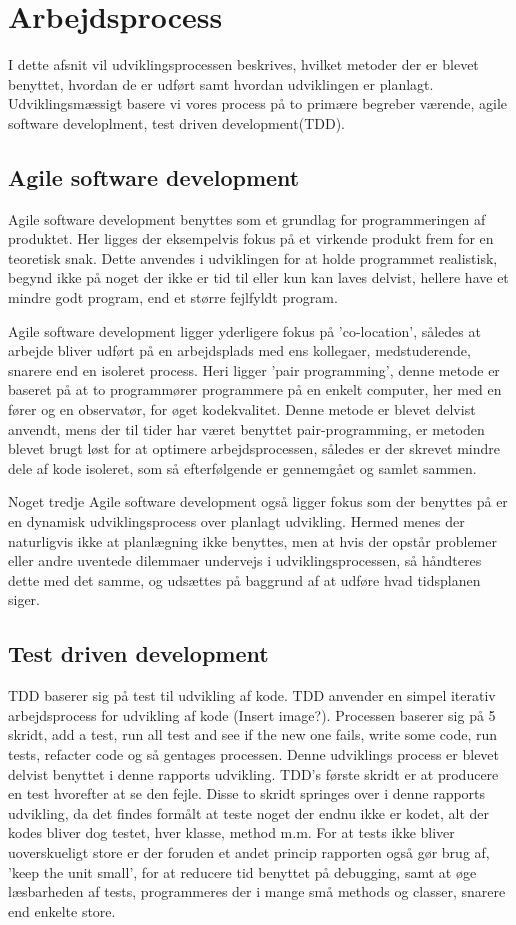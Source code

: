 \chapter{Arbejdsprocess}
I dette afsnit vil udviklingsprocessen beskrives, hvilket metoder der er blevet benyttet, hvordan de er udført samt hvordan udviklingen er planlagt. Udviklingsmæssigt basere vi vores process på to primære begreber værende, agile software developlment, test driven development(TDD).

\section{Agile software development}
Agile software development benyttes som et grundlag for programmeringen af produktet. Her ligges der eksempelvis fokus på et virkende produkt frem for en teoretisk snak. Dette anvendes i udviklingen for at holde programmet realistisk, begynd ikke på noget der ikke er tid til eller kun kan laves delvist, hellere have et mindre godt program, end et større fejlfyldt program.

Agile software development ligger yderligere fokus på 'co-location', således at arbejde bliver udført på en arbejdsplads med ens kollegaer, medstuderende, snarere end en isoleret process. Heri ligger 'pair programming', denne metode er baseret på at to programmører programmere på en enkelt computer, her med en fører og en observatør, for øget kodekvalitet. Denne metode er blevet delvist anvendt, mens der til tider har været benyttet pair-programming, er metoden blevet brugt løst for at optimere arbejdsprocessen, således er der skrevet mindre dele af kode isoleret, som så efterfølgende er gennemgået og samlet sammen.

Noget tredje Agile software development også ligger fokus som der benyttes på er en dynamisk udviklingsprocess over planlagt udvikling. Hermed menes der naturligvis ikke at planlægning ikke benyttes, men at hvis der opstår problemer eller andre uventede dilemmaer undervejs i udviklingsprocessen, så håndteres dette med det samme, og udsættes på baggrund af at udføre hvad tidsplanen siger. 

\section{Test driven development}
TDD baserer sig på test til udvikling af kode. TDD anvender en simpel iterativ arbejdsprocess for udvikling af kode (Insert image?). Processen baserer sig på 5 skridt, add a test, run all test and see if the new one fails, write some code, run tests, refacter code og så gentages processen. Denne udviklings process er blevet delvist benyttet i denne rapports udvikling. TDD's første skridt er at producere en test hvorefter at se den fejle. Disse to skridt springes over i denne rapports udvikling, da det findes formålt at teste noget der endnu ikke er kodet, alt der kodes bliver dog testet, hver klasse, method m.m. For at tests ikke bliver uoverskueligt store er der foruden et andet princip rapporten også gør brug af, 'keep the unit small', for at reducere tid benyttet på debugging, samt at øge læsbarheden af tests, programmeres der i mange små methods og classer, snarere end enkelte store.